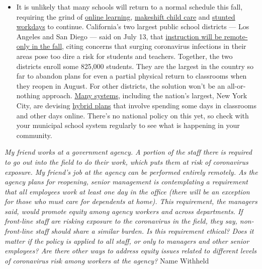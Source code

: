 \begin{itemize}
  \begin{itemize}
  \tightlist
  \item
    It is unlikely that many schools will return to a normal schedule
    this fall, requiring the grind of
    \href{https://www.nytimes.com/2020/06/05/us/coronavirus-education-lost-learning.html?action=click\&pgtype=Article\&state=default\&region=MAIN_CONTENT_3\&context=storylines_faq}{online
    learning},
    \href{https://www.nytimes.com/2020/05/29/us/coronavirus-child-care-centers.html?action=click\&pgtype=Article\&state=default\&region=MAIN_CONTENT_3\&context=storylines_faq}{makeshift
    child care} and
    \href{https://www.nytimes.com/2020/06/03/business/economy/coronavirus-working-women.html?action=click\&pgtype=Article\&state=default\&region=MAIN_CONTENT_3\&context=storylines_faq}{stunted
    workdays} to continue. California's two largest public school
    districts --- Los Angeles and San Diego --- said on July 13, that
    \href{https://www.nytimes.com/2020/07/13/us/lausd-san-diego-school-reopening.html?action=click\&pgtype=Article\&state=default\&region=MAIN_CONTENT_3\&context=storylines_faq}{instruction
    will be remote-only in the fall}, citing concerns that surging
    coronavirus infections in their areas pose too dire a risk for
    students and teachers. Together, the two districts enroll some
    825,000 students. They are the largest in the country so far to
    abandon plans for even a partial physical return to classrooms when
    they reopen in August. For other districts, the solution won't be an
    all-or-nothing approach.
    \href{https://bioethics.jhu.edu/research-and-outreach/projects/eschool-initiative/school-policy-tracker/}{Many
    systems}, including the nation's largest, New York City, are
    devising
    \href{https://www.nytimes.com/2020/06/26/us/coronavirus-schools-reopen-fall.html?action=click\&pgtype=Article\&state=default\&region=MAIN_CONTENT_3\&context=storylines_faq}{hybrid
    plans} that involve spending some days in classrooms and other days
    online. There's no national policy on this yet, so check with your
    municipal school system regularly to see what is happening in your
    community.
  \end{itemize}
\end{itemize}

\emph{My friend works at a government agency. A portion of the staff
there is required to go out into the field to do their work, which puts
them at risk of coronavirus exposure. My friend's job at the agency can
be performed entirely remotely. As the agency plans for reopening,
senior management is contemplating a requirement that all employees work
at least one day in the office (there will be an exception for those who
must care for dependents at home). This requirement, the managers said,
would promote equity among agency workers and across departments. If
front-line staff are risking exposure to the coronavirus in the field,
they say, non-front-line staff should share a similar burden. Is this
requirement ethical? Does it matter if the policy is applied to all
staff, or only to managers and other senior employees? Are there other
ways to address equity issues related to different levels of coronavirus
risk among workers at the agency?} Name Withheld

